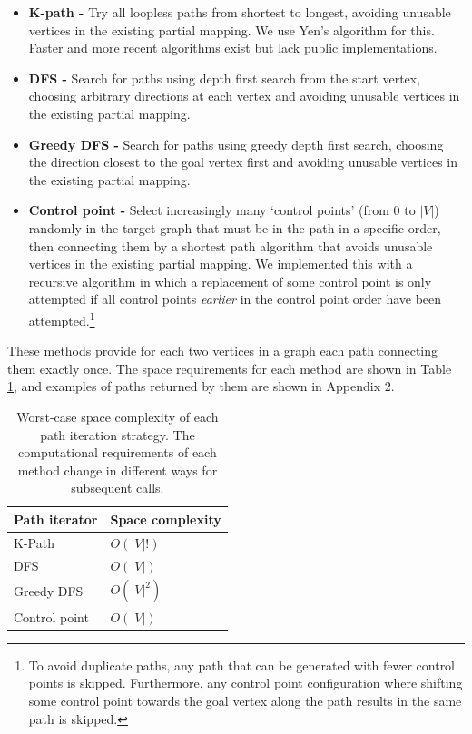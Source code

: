 \begin{itemize}
\item \textbf{K-path -} Try all loopless paths from shortest to longest, avoiding unusable vertices in the existing partial mapping. We use Yen's algorithm\cite{YensAlgorithm} for this. Faster and more recent algorithms exist\cite{Hershberger, Brander1996} but lack public implementations.

\item \textbf{DFS -} Search for paths using depth first search from the start vertex, choosing arbitrary directions at each vertex and avoiding unusable vertices in the existing partial mapping.

\item \textbf{Greedy DFS -} Search for paths using greedy depth first search, choosing the direction closest to the goal vertex first and avoiding unusable vertices in the existing partial mapping.

\item \textbf{Control point -} Select increasingly many `control points' (from $0$ to $|V|$) randomly in the target graph that must be in the path in a specific order, then connecting them by a shortest path algorithm that avoids unusable vertices in the existing partial mapping. We implemented this with a recursive algorithm in which a replacement of some control point is only attempted if all control points \textit{earlier} in the control point order have been attempted.\footnote{To avoid duplicate paths, any path that can be generated with fewer control points is skipped. Furthermore, any control point configuration where shifting some control point towards the goal vertex along the path results in the same path is skipped.}
\end{itemize}

These methods provide for each two vertices in a graph each path connecting them exactly once. The space requirements for each method are shown in Table \ref{tab:iterator-spacerequirements}, and examples of paths returned by them are shown in Appendix 2.

\begin{table}[]
\centering
\begin{tabular}{|l|l|}
\hline
\textbf{Path iterator} & \textbf{Space complexity} \\ \hline
K-Path                 & $O(|V|!)$                 \\ \hline
DFS                    & $O(|V|)$                  \\ \hline
Greedy DFS             & $O(|V|^2)$                \\ \hline
Control point          & $O(|V|)$                  \\ \hline
\end{tabular}
\caption{Worst-case space complexity of each path iteration strategy. The computational requirements of each method change in different ways for subsequent calls.}
\label{tab:iterator-spacerequirements}
\end{table}


